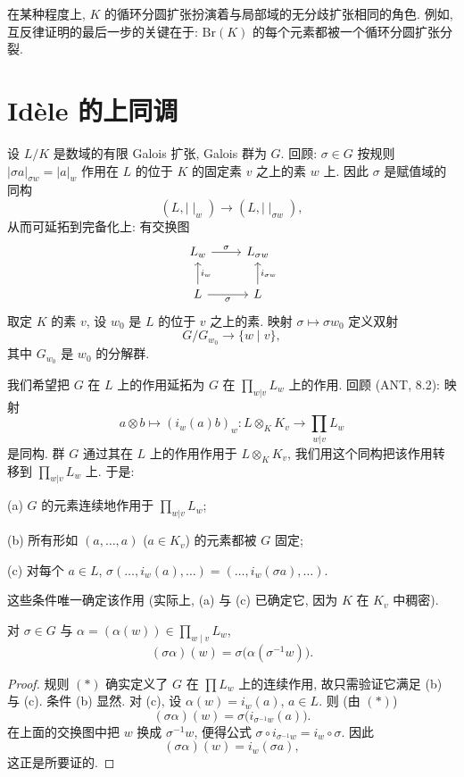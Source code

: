 在某种程度上, $K$ 的循环分圆扩张扮演着与局部域的无分歧扩张相同的角色. 例如, 互反律证明的最后一步的关键在于: $\mathrm{Br}(K)$ 的每个元素都被一个循环分圆扩张分裂.

\section{Idèle 的上同调}\label{sec:VII.2}

设 $L/K$ 是数域的有限 Galois 扩张, Galois 群为 $G$. 回顾: $\sigma\in G$ 按规则 $|\sigma a|_{\sigma w}=|a|_w$ 作用在 $L$ 的位于 $K$ 的固定素 $v$ 之上的素 $w$ 上. 因此 $\sigma$ 是赋值域的同构
\[
(L,|\mid_{w})\to(L,|\mid_{\sigma w}),
\]
从而可延拓到完备化上: 有交换图
\[
\begin{tikzcd}
L_{w}\ar[r, "\sigma"] & L_{\sigma w}\\
L\ar[u, "i_{w}"']\ar[r, "\sigma"'] & L\ar[u, "i_{\sigma w}"']
\end{tikzcd}
\]
取定 $K$ 的素 $v$, 设 $w_0$ 是 $L$ 的位于 $v$ 之上的素. 映射 $\sigma\mapsto\sigma w_0$ 定义双射
\[
G/G_{w_{0}}\to\{w\mid v\},
\]
其中 $G_{w_0}$ 是 $w_0$ 的分解群.

我们希望把 $G$ 在 $L$ 上的作用延拓为 $G$ 在 $\prod_{w|v}L_w$ 上的作用. 回顾 (ANT, 8.2): 映射
\[
a\otimes b\mapsto(i_{w}(a)b)_{w}\colon L\otimes_{K}K_{v}\to\prod_{w|v}L_{w}
\]
是同构. 群 $G$ 通过其在 $L$ 上的作用作用于 $L\otimes_K K_v$, 我们用这个同构把该作用转移到 $\prod_{w|v}L_w$ 上. 于是:

(a) $G$ 的元素连续地作用于 $\prod_{w|v}L_w$;

(b) 所有形如 $(a,\ldots,a)$ ($a\in K_v$) 的元素都被 $G$ 固定;

(c) 对每个 $a\in L$, $\sigma(\ldots,i_w(a),\ldots)=(\ldots,i_w(\sigma a),\ldots)$.

这些条件唯一确定该作用 (实际上, (a) 与 (c) 已确定它, 因为 $K$ 在 $K_v$ 中稠密).

\begin{lemma}\label{lem:vii.2.1}
对 $\sigma\in G$ 与 $\alpha=(\alpha(w))\in\prod_{w\mid v}L_w$,
\begin{equation*}
(\sigma\alpha)(w)=\sigma\bigl(\alpha(\sigma^{-1}w)\bigr).
\tag{$*$}
\end{equation*}
\end{lemma}

\begin{proof}
规则 $(*)$ 确实定义了 $G$ 在 $\prod L_w$ 上的连续作用, 故只需验证它满足 (b) 与 (c). 条件 (b) 显然. 对 (c), 设 $\alpha(w)=i_w(a)$, $a\in L$. 则 (由 $(*)$)
\[
(\sigma\alpha)(w)=\sigma\bigl(i_{\sigma^{-1}w}(a)\bigr).
\]
在上面的交换图中把 $w$ 换成 $\sigma^{-1}w$, 便得公式 $\sigma\circ i_{\sigma^{-1}w}=i_{w}\circ\sigma$. 因此
\[
(\sigma\alpha)(w)=i_{w}(\sigma a),
\]
这正是所要证的.
\end{proof}

